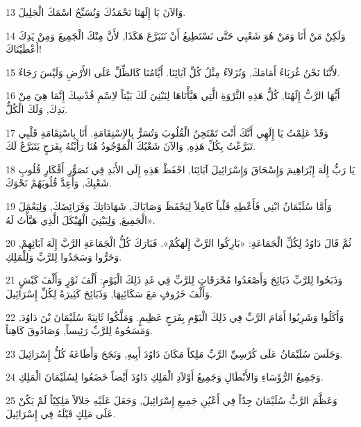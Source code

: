 \par 13 وَالآنَ يَا إِلَهَنَا نَحْمَدُكَ وَنُسَبِّحُ اسْمَكَ الْجَلِيلَ.
\par 14 وَلَكِنْ مَنْ أَنَا وَمَنْ هُوَ شَعْبِي حَتَّى نَسْتَطِيعُ أَنْ نَتَبَرَّعَ هَكَذَا, لأَنَّ مِنْكَ الْجَمِيعَ وَمِنْ يَدِكَ أَعْطَيْنَاكَ!
\par 15 لأَنَّنَا نَحْنُ غُرَبَاءُ أَمَامَكَ, وَنُزَلاَءُ مِثْلُ كُلِّ آبَائِنَا. أَيَّامُنَا كَالظِّلِّ عَلَى الأَرْضِ وَلَيْسَ رَجَاءٌ.
\par 16 أَيُّهَا الرَّبُّ إِلَهُنَا, كُلُّ هَذِهِ الثَّرْوَةِ الَّتِي هَيَّأْنَاهَا لِنَبْنِيَ لَكَ بَيْتاً لاِسْمِ قُدْسِكَ إِنَّمَا هِيَ مِنْ يَدِكَ, وَلَكَ الْكُلُّ.
\par 17 وَقَدْ عَلِمْتُ يَا إِلَهِي أَنَّكَ أَنْتَ تَمْتَحِنُ الْقُلُوبَ وَتُسَرُّ بِالاِسْتِقَامَةِ. أَنَا بِاسْتِقَامَةِ قَلْبِي تَبَرَّعْتُ بِكُلِّ هَذِهِ, وَالآنَ شَعْبُكَ الْمَوْجُودُ هُنَا رَأَيْتُهُ بِفَرَحٍ يَتَبَرَّعُ لَكَ.
\par 18 يَا رَبُّ إِلَهَ إِبْرَاهِيمَ وَإِسْحَاقَ وَإِسْرَائِيلَ آبَائِنَا, احْفَظْ هَذِهِ إِلَى الأَبَدِ فِي تَصَوُّرِ أَفْكَارِ قُلُوبِ شَعْبِكَ, وَأَعِدَّ قُلُوبَهُمْ نَحْوَكَ.
\par 19 وَأَمَّا سُلَيْمَانُ ابْنِي فَأَعْطِهِ قَلْباً كَامِلاً لِيَحْفَظَ وَصَايَاكَ, شَهَادَاتِكَ وَفَرَائِضَكَ, وَلِيَعْمَلَ الْجَمِيعَ, وَلِيَبْنِيَ الْهَيْكَلَ الَّذِي هَيَّأْتُ لَهُ».
\par 20 ثُمَّ قَالَ دَاوُدُ لِكُلِّ الْجَمَاعَةِ: «بَارِكُوا الرَّبَّ إِلَهَكُمْ». فَبَارَكَ كُلُّ الْجَمَاعَةِ الرَّبَّ إِلَهَ آبَائِهِمْ, وَخَرُّوا وَسَجَدُوا لِلرَّبِّ وَلِلْمَلِكِ.
\par 21 وَذَبَحُوا لِلرَّبِّ ذَبَائِحَ وَأَصْعَدُوا مُحْرَقَاتٍ لِلرَّبِّ فِي غَدِ ذَلِكَ الْيَوْمِ: أَلْفَ ثَوْرٍ وَأَلْفَ كَبْشٍ وَأَلْفَ خَرُوفٍ مَعَ سَكَائِبِهَا, وَذَبَائِحَ كَثِيرَةً لِكُلِّ إِسْرَائِيلَ.
\par 22 وَأَكَلُوا وَشَرِبُوا أَمَامَ الرَّبِّ فِي ذَلِكَ الْيَوْمِ بِفَرَحٍ عَظِيمٍ. وَمَلَّكُوا ثَانِيَةً سُلَيْمَانَ بْنَ دَاوُدَ, وَمَسَحُوهُ لِلرَّبِّ رَئِيساً, وَصَادُوقَ كَاهِناً.
\par 23 وَجَلَسَ سُلَيْمَانُ عَلَى كُرْسِيِّ الرَّبِّ مَلِكاً مَكَانَ دَاوُدَ أَبِيهِ, وَنَجَحَ وَأَطَاعَهُ كُلُّ إِسْرَائِيلَ.
\par 24 وَجَمِيعُ الرُّؤَسَاءِ وَالأَبْطَالِ وَجَمِيعُ أَوْلاَدِ الْمَلِكِ دَاوُدَ أَيْضاً خَضَعُوا لِسُلَيْمَانَ الْمَلِكِ.
\par 25 وَعَظَّمَ الرَّبُّ سُلَيْمَانَ جِدّاً فِي أَعْيُنِ جَمِيعِ إِسْرَائِيلَ, وَجَعَلَ عَلَيْهِ جَلاَلاً مَلِكِيّاً لَمْ يَكُنْ عَلَى مَلِكٍ قَبْلَهُ فِي إِسْرَائِيلَ.
